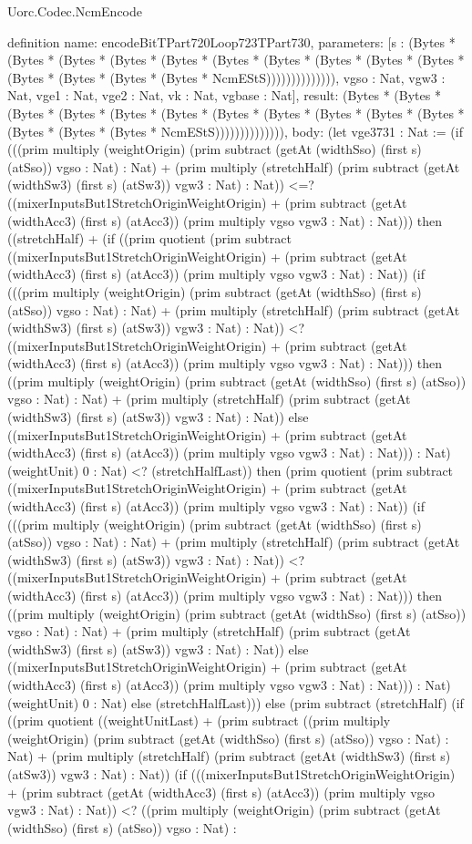 \begin{lexlean}{Uorc.Codec.NcmEncode}
\begin{semanticmodule}
definition{
  name: encodeBitTPart720Loop723TPart730,
  parameters: [s : (Bytes * (Bytes * (Bytes * (Bytes * (Bytes * (Bytes * (Bytes * (Bytes * (Bytes * (Bytes * (Bytes * (Bytes * (Bytes * (Bytes * NcmEStS)))))))))))))), vgso : Nat, vgw3 : Nat, vge1 : Nat, vge2 : Nat, vk : Nat, vgbase : Nat],
  result: (Bytes * (Bytes * (Bytes * (Bytes * (Bytes * (Bytes * (Bytes * (Bytes * (Bytes * (Bytes * (Bytes * (Bytes * (Bytes * (Bytes * NcmEStS)))))))))))))),
  body: (let vge3731 : Nat := (if (((prim multiply (weightOrigin) (prim subtract (getAt (widthSso) (first s) (atSso)) vgso : Nat) : Nat) + (prim multiply (stretchHalf) (prim subtract (getAt (widthSw3) (first s) (atSw3)) vgw3 : Nat) : Nat)) <=? ((mixerInputsBut1StretchOriginWeightOrigin) + (prim subtract (getAt (widthAcc3) (first s) (atAcc3)) (prim multiply vgso vgw3 : Nat) : Nat))) then ((stretchHalf) + (if ((prim quotient (prim subtract ((mixerInputsBut1StretchOriginWeightOrigin) + (prim subtract (getAt (widthAcc3) (first s) (atAcc3)) (prim multiply vgso vgw3 : Nat) : Nat)) (if (((prim multiply (weightOrigin) (prim subtract (getAt (widthSso) (first s) (atSso)) vgso : Nat) : Nat) + (prim multiply (stretchHalf) (prim subtract (getAt (widthSw3) (first s) (atSw3)) vgw3 : Nat) : Nat)) <? ((mixerInputsBut1StretchOriginWeightOrigin) + (prim subtract (getAt (widthAcc3) (first s) (atAcc3)) (prim multiply vgso vgw3 : Nat) : Nat))) then ((prim multiply (weightOrigin) (prim subtract (getAt (widthSso) (first s) (atSso)) vgso : Nat) : Nat) + (prim multiply (stretchHalf) (prim subtract (getAt (widthSw3) (first s) (atSw3)) vgw3 : Nat) : Nat)) else ((mixerInputsBut1StretchOriginWeightOrigin) + (prim subtract (getAt (widthAcc3) (first s) (atAcc3)) (prim multiply vgso vgw3 : Nat) : Nat))) : Nat) (weightUnit) 0 : Nat) <? (stretchHalfLast)) then (prim quotient (prim subtract ((mixerInputsBut1StretchOriginWeightOrigin) + (prim subtract (getAt (widthAcc3) (first s) (atAcc3)) (prim multiply vgso vgw3 : Nat) : Nat)) (if (((prim multiply (weightOrigin) (prim subtract (getAt (widthSso) (first s) (atSso)) vgso : Nat) : Nat) + (prim multiply (stretchHalf) (prim subtract (getAt (widthSw3) (first s) (atSw3)) vgw3 : Nat) : Nat)) <? ((mixerInputsBut1StretchOriginWeightOrigin) + (prim subtract (getAt (widthAcc3) (first s) (atAcc3)) (prim multiply vgso vgw3 : Nat) : Nat))) then ((prim multiply (weightOrigin) (prim subtract (getAt (widthSso) (first s) (atSso)) vgso : Nat) : Nat) + (prim multiply (stretchHalf) (prim subtract (getAt (widthSw3) (first s) (atSw3)) vgw3 : Nat) : Nat)) else ((mixerInputsBut1StretchOriginWeightOrigin) + (prim subtract (getAt (widthAcc3) (first s) (atAcc3)) (prim multiply vgso vgw3 : Nat) : Nat))) : Nat) (weightUnit) 0 : Nat) else (stretchHalfLast))) else (prim subtract (stretchHalf) (if ((prim quotient ((weightUnitLast) + (prim subtract ((prim multiply (weightOrigin) (prim subtract (getAt (widthSso) (first s) (atSso)) vgso : Nat) : Nat) + (prim multiply (stretchHalf) (prim subtract (getAt (widthSw3) (first s) (atSw3)) vgw3 : Nat) : Nat)) (if (((mixerInputsBut1StretchOriginWeightOrigin) + (prim subtract (getAt (widthAcc3) (first s) (atAcc3)) (prim multiply vgso vgw3 : Nat) : Nat)) <? ((prim multiply (weightOrigin) (prim subtract (getAt (widthSso) (first s) (atSso)) vgso : Nat) : }
\end{semanticmodule}
\end{lexlean}
